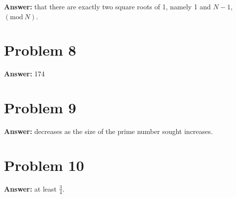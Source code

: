 \documentclass[11pt]{article}
\newcommand{\Mod}{\mathrm{mod}\:}
\begin{document}
\textbf{Answer:} that there are exactly two square roots of 1, namely 1 and \(N-1\),
\((\Mod N)\).
\section*{Problem 8}
\label{sec:orgc66a54e}

\textbf{Answer:} 174
\section*{Problem 9}
\label{sec:orgce4edc8}

\textbf{Answer:} decreases as the size of the prime number sought increases.
\section*{Problem 10}
\label{sec:org005ecde}

\textbf{Answer:} at least \(\frac{3}{4}\).
\end{document}
